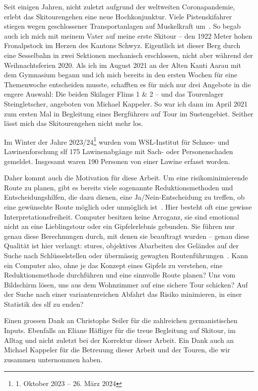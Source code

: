


Seit einigen Jahren, nicht zuletzt aufgrund der weltweiten Coronapandemie, erlebt das Skitourengehen eine neue Hochkonjunktur. Viele Pistenskifahrer stiegen wegen geschlossener Transportanlagen auf Muskelkraft um~\cite{sacCoronaTrend}. So begab auch ich mich mit meinem Vater auf meine erste Skitour – den 1922 Meter hohen Fronalpstock im Herzen des Kantons Schwyz. Eigentlich ist dieser Berg durch eine Sesselbahn in zwei Sektionen mechanisch erschlossen, nicht aber während der Weihnachtsferien 2020.
Als ich im August 2021 an der Alten Kanti Aarau mit dem Gymnasium begann und ich mich bereits in den ersten Wochen für eine Themenwoche entscheiden musste, schafften es für mich nur drei Angebote in die engere Auswahl: Die beiden Skilager Flims 1 \& 2 – und das Tourenlager Steingletscher, angeboten von Michael Kappeler. So war ich dann im April 2021 zum ersten Mal in Begleitung eines Bergführers auf Tour im Sustengebiet. Seither lässt mich das Skitourengehen nicht mehr los.

Im Winter der Jahre 2023/24\footnote{1. Oktober 2023 -- 26. März 2024} wurden vom WSL-Institut für Schnee- und Lawinenforschung \gls{slf} 175 Lawinenabgänge mit Sach- oder Personenschaden gemeldet. Insgesamt waren 190 Personen von einer Lawine erfasst worden.~\cite{slfWinterbericht202324}

Daher kommt auch die Motivation für diese Arbeit. Um eine risikominimierende Route zu planen, gibt es bereits viele sogenannte Reduktionsmethoden und Entscheidungshilfen, die dazu dienen, eine Ja/Nein-Entscheidung zu treffen, ob eine gewünschte Route möglich oder unmöglich ist~\cite{skitourenguruReduktionsmethoden}\cite{harveyrhynerschweizerlawinenkunde}.
Hier besteht oft eine gewisse Interpretationsfreiheit. Computer besitzen keine Arroganz, sie sind emotional nicht an eine Lieblingstour oder ein Gipfelerlebnis gebunden. Sie führen nur genau diese Berechnungen durch, mit denen sie beauftragt wurden – genau diese Qualität ist hier verlangt: stures, objektives Abarbeiten des Geländes auf der Suche nach Schlüsselstellen oder übermässig gewagten Routenführungen~\cite{harveyrhynerschweizerlawinenkunde}. Kann ein Computer also, ohne je das Konzept eines Gipfels zu verstehen, eine Reduktionsmethode durchführen und eine sinnvolle Route planen? Uns vom Bildschirm lösen, uns aus dem Wohnzimmer auf eine sichere Tour schicken? 
Auf der Suche nach einer variantenreichen Abfahrt das Risiko minimieren, in einer Statistik des \gls{slf} zu enden?

Einen grossen Dank an Christophe Seiler für die zahlreichen germanistischen Inputs. Ebenfalls an Eliane Häfliger für die treue Begleitung auf Skitour, im Alltag und nicht zuletzt bei der Korrektur dieser Arbeit. Ein Dank auch an Michael Kappeler für die Betreuung dieser Arbeit und der Touren, die wir zusammen unternommen haben.

